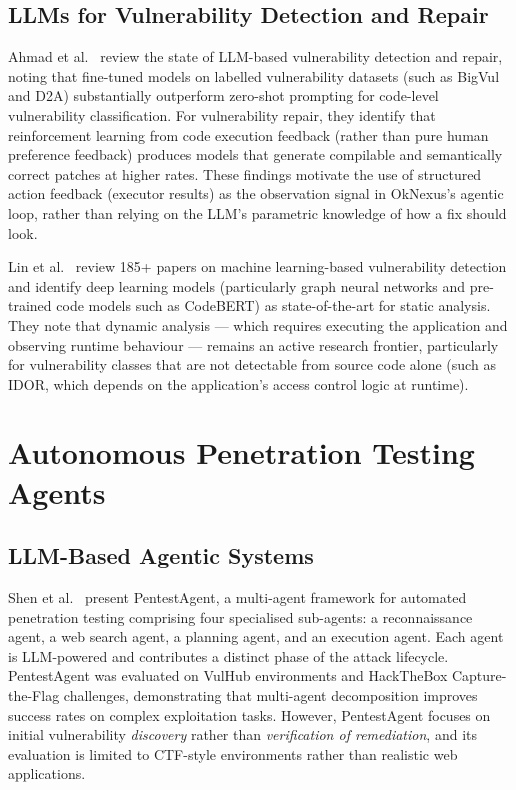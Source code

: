 \subsection{LLMs for Vulnerability Detection and Repair}

Ahmad et al.\ \cite{llm_vuln_repair2026} review the state of LLM-based vulnerability detection and repair, noting that fine-tuned models on labelled vulnerability datasets (such as BigVul and D2A) substantially outperform zero-shot prompting for code-level vulnerability classification. For vulnerability repair, they identify that reinforcement learning from code execution feedback (rather than pure human preference feedback) produces models that generate compilable and semantically correct patches at higher rates. These findings motivate the use of structured action feedback (executor results) as the observation signal in OkNexus's agentic loop, rather than relying on the LLM's parametric knowledge of how a fix should look.

Lin et al.\ \cite{vuln_detection_ml_survey2024} review 185+ papers on machine learning-based vulnerability detection and identify deep learning models (particularly graph neural networks and pre-trained code models such as CodeBERT) as state-of-the-art for static analysis. They note that dynamic analysis --- which requires executing the application and observing runtime behaviour --- remains an active research frontier, particularly for vulnerability classes that are not detectable from source code alone (such as IDOR, which depends on the application's access control logic at runtime).

\section{Autonomous Penetration Testing Agents}

\subsection{LLM-Based Agentic Systems}

Shen et al.\ \cite{pentest_agent2024} present PentestAgent, a multi-agent framework for automated penetration testing comprising four specialised sub-agents: a reconnaissance agent, a web search agent, a planning agent, and an execution agent. Each agent is LLM-powered and contributes a distinct phase of the attack lifecycle. PentestAgent was evaluated on VulHub environments and HackTheBox Capture-the-Flag challenges, demonstrating that multi-agent decomposition improves success rates on complex exploitation tasks. However, PentestAgent focuses on initial vulnerability \textit{discovery} rather than \textit{verification of remediation}, and its evaluation is limited to CTF-style environments rather than realistic web applications.

